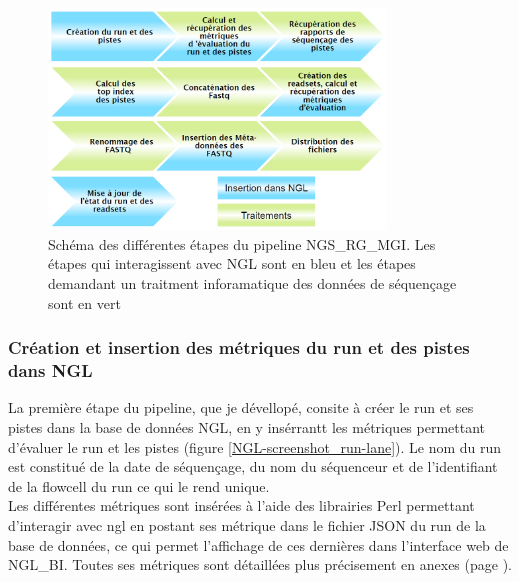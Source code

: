 \begin{figure}[H]
    \centering
    \includegraphics[width=0.8\textwidth]{img/schema-ngsrg-mgi.png}
    \caption{\footnotesize{Schéma des différentes étapes du pipeline NGS\_RG\_MGI. Les étapes qui interagissent avec NGL sont en bleu et les étapes demandant un traitment inforamatique des données de séquençage sont en vert}}
    \label{schema-ngsrg-mgi}
\end{figure}

\subsubsection*{Création et insertion des métriques du run et des pistes dans NGL }
La première étape du pipeline, que je dévellopé, consite à créer le run et ses pistes dans la base de données NGL, en y insérrantt les métriques permettant d'évaluer le run et les pistes (figure \ref{NGL-screenshot_run-lane}).
Le nom du run est constitué de la date de séquençage, du nom du séquenceur et de l'identifiant de la flowcell du run ce qui le rend unique.\\

Les différentes métriques sont insérées à l'aide des librairies Perl permettant d'interagir avec ngl en postant ses métrique dans le fichier JSON du run de la base de données, ce qui permet l'affichage de ces dernières dans l'interface web de NGL\_BI. Toutes ses métriques sont détaillées plus précisement en anexes (page \pageref{anexes1}).\\

